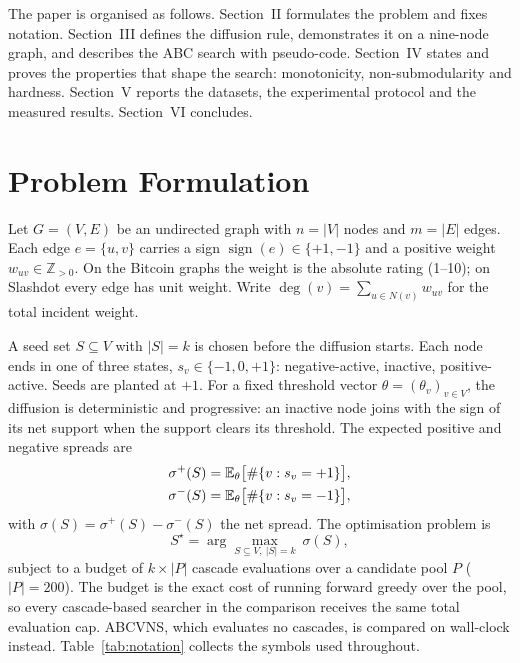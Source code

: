 \documentclass[journal,letterpaper,10pt]{IEEEtran}
\begin{document}
The paper is organised as follows. Section~II formulates the problem and fixes notation. Section~III defines the diffusion rule, demonstrates it on a nine-node graph, and describes the ABC search with pseudo-code. Section~IV states and proves the properties that shape the search: monotonicity, non-submodularity and hardness. Section~V reports the datasets, the experimental protocol and the measured results. Section~VI concludes.

\section{Problem Formulation}

Let $G=(V,E)$ be an undirected graph with $n=|V|$ nodes and $m=|E|$ edges. Each edge $e=\{u,v\}$ carries a sign $\operatorname{sign}(e)\in\{+1,-1\}$ and a positive weight $w_{uv}\in\mathbb{Z}_{>0}$. On the Bitcoin graphs the weight is the absolute rating (1--10); on Slashdot every edge has unit weight. Write $\deg(v)=\sum_{u\in N(v)} w_{uv}$ for the total incident weight.

A seed set $S\subseteq V$ with $|S|=k$ is chosen before the diffusion starts. Each node ends in one of three states, $s_v\in\{-1,0,+1\}$: negative-active, inactive, positive-active. Seeds are planted at $+1$. For a fixed threshold vector $\theta=(\theta_v)_{v\in V}$, the diffusion is deterministic and progressive: an inactive node joins with the sign of its net support when the support clears its threshold. The expected positive and negative spreads are
\begin{align}
\sigma^{+}(S)&=\mathbb{E}_{\theta}\bigl[\#\{v:s_v=+1\}\bigr],\label{eq:spreads}\\
\sigma^{-}(S)&=\mathbb{E}_{\theta}\bigl[\#\{v:s_v=-1\}\bigr],\notag
\end{align}
with $\sigma(S)=\sigma^{+}(S)-\sigma^{-}(S)$ the net spread. The optimisation problem is
\begin{equation}
S^{\star}=\arg\max_{S\subseteq V,\ |S|=k}\ \sigma(S),
\label{eq:problem}
\end{equation}
subject to a budget of $k\times|P|$ cascade evaluations over a candidate pool $P$ ($|P|=200$). The budget is the exact cost of running forward greedy over the pool, so every cascade-based searcher in the comparison receives the same total evaluation cap. ABCVNS, which evaluates no cascades, is compared on wall-clock instead. Table~\ref{tab:notation} collects the symbols used throughout.
\end{document}
